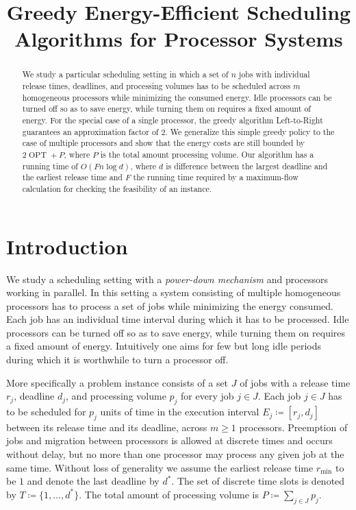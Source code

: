 \documentclass[a4paper]{article}
\title{Greedy Energy-Efficient Scheduling Algorithms for Processor Systems}
\DeclareMathOperator{\OPT}{OPT}
\begin{document}
%

\begin{abstract}
  We study a particular scheduling setting in which a set of $n$ jobs with individual release times, deadlines, and processing volumes has to be scheduled across $m$ homogeneous processors while minimizing the consumed energy.
  Idle processors can be turned off so as to save energy, while turning them on requires a fixed amount of energy.
  For the special case of a single processor, the greedy algorithm Left-to-Right guarantees an approximation factor of $2$.
  We generalize this simple greedy policy to the case of multiple processors and show that the energy costs are still bounded by $2 \OPT + P$, where $P$ is the total amount processing volume.
  Our algorithm has a running time of $O(F n \log d)$, where $d$ is difference between the largest deadline and the earliest release time and $F$ the running time required by a maximum-flow calculation for checking the feasibility of an instance.
\end{abstract}

\tableofcontents

\section{Introduction}

We study a scheduling setting with a \emph{power-down mechanism} and processors working in parallel.
In this setting a system consisting of multiple homogeneous processors has to process a set of jobs while minimizing the energy consumed.
Each job has an individual time interval during which it has to be processed.
Idle processors can be turned off so as to save energy, while turning them on requires a fixed amount of energy.
Intuitively one aims for few but long idle periods during which it is worthwhile to turn a processor off.

More specifically a problem instance consists of a set $J$ of jobs with a release time $r_j$, deadline $d_j$, and processing volume $p_j$ for every job $j \in J$.
Each job $j \in J$ has to be scheduled for $p_j$ units of time in the execution interval $E_j \coloneqq [r_j, d_j]$ between its release time and its deadline, across $m \geq 1$ processors.
Preemption of jobs and migration between processors is allowed at discrete times and occurs without delay, but no more than one processor may process any given job at the same time.
Without loss of generality we assume the earliest release time $r_{\min}$ to be $1$ and denote the last deadline by $d^*$.
The set of discrete time slots is denoted by $T \coloneqq \{1, \ldots, d^*\}$.
The total amount of processing volume is $P \coloneqq \sum_{j \in J} p_j$.
\end{document}
